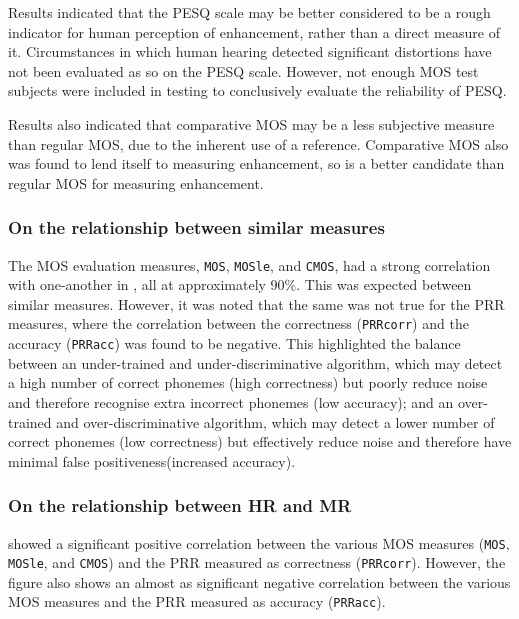 Results indicated that the \ac{PESQ} scale may be better considered
to be a rough indicator for human perception of enhancement, rather
than a direct measure of it. Circumstances in which human hearing
detected significant distortions have not been evaluated as so on
the \ac{PESQ} scale. However, not enough \ac{MOS} test subjects
were included in testing to conclusively evaluate the reliability
of \ac{PESQ}.

Results also indicated that comparative \ac{MOS} may be a less subjective
measure than regular \ac{MOS}, due to the inherent use of a reference.
Comparative \ac{MOS} also was found to lend itself to measuring enhancement,
so is a better candidate than regular \ac{MOS} for measuring enhancement.


\subsubsection*{On the relationship between similar measures}

The \ac{MOS} evaluation measures, \lstinline!MOS!, \lstinline!MOSle!,
and \lstinline!CMOS!, had a strong correlation with one-another in
, all at approximately 90\%. This was expected between
similar measures. However, it was noted that the same was not true
for the \ac{PRR} measures, where the correlation between the correctness
(\lstinline!PRRcorr!) and the accuracy (\lstinline!PRRacc!) was
found to be negative. This highlighted the balance between an under-trained
and under-discriminative algorithm, which may detect a high number
of correct phonemes (high correctness) but poorly reduce noise and
therefore recognise extra incorrect phonemes (low accuracy); and an
over-trained and over-discriminative algorithm, which may detect a
lower number of correct phonemes (low correctness) but effectively
reduce noise and therefore have minimal false positiveness(increased
accuracy).


\subsubsection*{On the relationship between \acl{HR} and \acl{MR}}

 showed a significant positive correlation between
the various \ac{MOS} measures (\lstinline!MOS!, \lstinline!MOSle!,
and \lstinline!CMOS!) and the \ac{PRR} measured as correctness (\lstinline!PRRcorr!).
However, the figure also shows an almost as significant negative correlation
between the various \ac{MOS} measures and the \ac{PRR} measured
as accuracy (\lstinline!PRRacc!).

